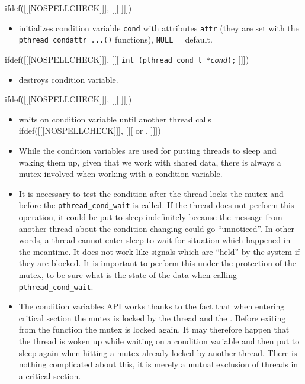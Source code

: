 \begin{slide}
\prgchars
ifdef([[[NOSPELLCHECK]]], [[[
]]])
\begin{itemize}
\item initializes condition variable \texttt{cond} with attributes \texttt{attr}
(they are set with the \texttt{pthread\_condattr\_...()} functions),
\texttt{NULL} = default.
\end{itemize}
ifdef([[[NOSPELLCHECK]]], [[[
\texttt{int (pthread\_cond\_t *\emph{cond});}
]]])
\begin{itemize}
\item destroys condition variable.
\end{itemize}
ifdef([[[NOSPELLCHECK]]], [[[
]]])
\begin{itemize}
\item waits on condition variable until another thread calls
ifdef([[[NOSPELLCHECK]]], [[[
 or .
]]])
\end{itemize}
\end{slide}

\begin{itemize}
\item While the condition variables are used for putting threads to sleep and
waking them up, given that we work with shared data, there is always a mutex
involved when working with a condition variable.
\item It is necessary to test the condition after the thread locks the mutex
and before the \texttt{pthread\_cond\_wait} is called. If the thread does not
perform this operation, it could be put to sleep indefinitely because the 
message from another thread about the condition changing could go ``unnoticed''.
In other words, a thread cannot enter sleep to wait for situation which happened
in the meantime. It does not work like signals which are ``held'' by the system
if they are blocked. It is important to perform this under the protection of
the mutex, to be sure what is the state of the data when calling
\texttt{pthread\_cond\_wait}.
\item The condition variables API works thanks to the fact that when entering
critical section the mutex is locked by the thread and the
. Before exiting from the function the mutex is locked
again.  It may therefore happen that the thread is woken up while waiting on a
condition variable and then put to sleep again when hitting a mutex already
locked by another thread.  There is nothing complicated about this, it is merely
a mutual exclusion of threads in a critical section.
\end{itemize}

